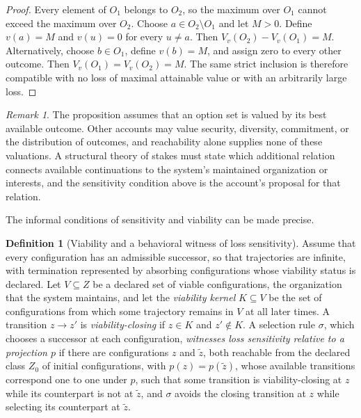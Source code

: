 \documentclass[11pt]{article}
\theoremstyle{definition}
\newtheorem{definition}{Definition}
\theoremstyle{plain}
\theoremstyle{remark}
\newtheorem*{remark}{Remark}
\begin{document}
\begin{proof}
Every element of $O_1$ belongs to $O_2$, so the maximum over $O_1$ cannot exceed the maximum over $O_2$. Choose $a \in O_2 \setminus O_1$ and let $M > 0$. Define $v(a) = M$ and $v(u) = 0$ for every $u \neq a$. Then $V_v(O_2) - V_v(O_1) = M$. Alternatively, choose $b \in O_1$, define $v(b) = M$, and assign zero to every other outcome. Then $V_v(O_1) = V_v(O_2) = M$. The same strict inclusion is therefore compatible with no loss of maximal attainable value or with an arbitrarily large loss.
\end{proof}

\begin{remark}
The proposition assumes that an option set is valued by its best available outcome. Other accounts may value security, diversity, commitment, or the distribution of outcomes, and reachability alone supplies none of these valuations. A structural theory of stakes must state which additional relation connects available continuations to the system's maintained organization or interests, and the sensitivity condition above is the account's proposal for that relation.
\end{remark}

The informal conditions of sensitivity and viability can be made precise.

\begin{definition}[Viability and a behavioral witness of loss sensitivity]
Assume that every configuration has an admissible successor, so that trajectories are infinite, with termination represented by absorbing configurations whose viability status is declared. Let $V \subseteq Z$ be a declared set of viable configurations, the organization that the system maintains, and let the \emph{viability kernel} $K \subseteq V$ be the set of configurations from which some trajectory remains in $V$ at all later times. A transition $z \to z'$ is \emph{viability-closing} if $z \in K$ and $z' \notin K$. A selection rule $\sigma$, which chooses a successor at each configuration, \emph{witnesses loss sensitivity relative to a projection $p$} if there are configurations $z$ and $\tilde z$, both reachable from the declared class $Z_0$ of initial configurations, with $p(z) = p(\tilde z)$, whose available transitions correspond one to one under $p$, such that some transition is viability-closing at $z$ while its counterpart is not at $\tilde z$, and $\sigma$ avoids the closing transition at $z$ while selecting its counterpart at $\tilde z$.
\end{definition}
\end{document}
